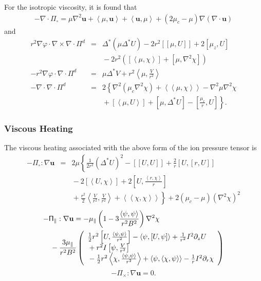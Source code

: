 \documentclass[letterpaper]{book}
\renewcommand{\vec}[1]{\ensuremath{\mathbf{#1}}}
\newcommand{\tensor}[1]{\mathsf{#1}}
\newcommand{\tor}{\varphi}              %
\renewcommand{\u}{\vec{u}}
\renewcommand{\P}{\tensor{\Pi}}
\newcommand{\grad}[1]{\nabla #1}
\renewcommand{\div}[1]{\nabla \cdot #1}
\newcommand{\curl}[1]{\nabla \times #1}
\newcommand{\dotdot}{:}
\newcommand{\gs}[1]{\Delta^* #1}
\newcommand{\lp}[1]{\nabla^2 #1}
\newcommand{\pb}[2]{\left[#1,#2\right]}
\newcommand{\ip}[2]{\left\langle  #1,#2\right\rangle}
\newcommand{\funcss}[2]{
  \left\langle\left\langle #1,#2 \right\rangle\right\rangle}
\newcommand{\funcsa}[2]{\left[\left\langle #1,#2 \right\rangle\right]}
\newcommand{\funcaa}[2]{\left[\left[ #1,#2 \right]\right]}
\begin{document}
For the isotropic viscosity, it is found that
\begin{eqnarray*}
  -\div{\P_\circ} = \mu \lp{\u} + \ip{\mu}{\u} + \ip{\u}{\mu}
  + (2 \mu_c - \mu) \grad{(\div{\u})}
\end{eqnarray*}
and
\begin{eqnarray}
   r^2 \grad{\tor} \cdot \curl{\div \P^d} & = & 
   \gs{(\mu \gs{U})} - 2 r^2 \funcaa{\mu}{U} + 2\pb{\mu_z}{U}
   \\ \nonumber && \mbox{} 
   - 2 r^2 \left( \funcsa{\mu}{\chi} + \pb{\mu}{\lp{\chi}} \right)
   \\
   -r^2 \grad \tor \cdot \div \P^d & = & \mu \gs{V} 
   + r^2 \ip{\mu}{\frac{V}{r^2}}
   \\
   -\div \div \P^d & = & 2 \left\{ \lp{(\mu_c \lp{\chi})} 
   + \funcss{\mu}{\chi} - \lp{\mu}\lp{\chi}
   \right. \\ && \left. \nonumber \mbox{}
   + \funcsa{\mu}{U} + \pb{\mu}{\gs{U}} - \pb{\frac{\mu_r}{r}}{U} 
   \right\}.
\end{eqnarray}

\subsubsection{Viscous Heating}

The viscous heating associated with the above form of the ion pressure
tensor is
\begin{eqnarray}
  - \P_\circ \dotdot \grad{\u} & = & 2 \mu \left\{
    \frac{1}{2 r^2} (\gs{U})^2 
    - \funcaa{U}{U} + \frac{2}{r} \pb{U}{\pb{r}{U}}
    \right. \\ \nonumber & & \left. \mbox{} 
    - 2 \funcsa{U}{\chi} + 2 \pb{U}{\frac{\ip{r}{\chi}}{r}}
    \right. \\ \nonumber & & \left. \mbox{}
    + \frac{r^2}{2} \ip{\frac{V}{r^2}}{\frac{V}{r^2}}
    + \funcss{\chi}{\chi} \right\}
  + 2 (\mu_c - \mu) (\lp{\chi})^2
\end{eqnarray}
\begin{eqnarray}
  \lefteqn{-\P_\parallel \dotdot \grad{\u} = - \mu_\parallel
    \left( 1-3 \frac{\ip{\psi}{\psi}}{r^2 B^2} \right) \lp{\chi}}
  \\ && \mbox{}
    - \frac{3 \mu_\parallel}{r^2 B^2} \left( \begin{array}{l}
      \frac{1}{2} r^2 \pb{U}{\frac{\ip{\psi}{\psi}}{r^2}}
      -\ip{\psi}{\pb{U}{\psi}} + \frac{1}{r^2} I^2 \partial_z U
       \\ \mbox{}
    + r^2 I \pb{\psi}{\frac{V}{r^2}}
       \\ \mbox{}
    - \frac{1}{2}r^2 \ip{\chi}{\frac{\ip{\psi}{\psi}}{r^2}}
    + \ip{\psi}{\ip{\chi}{\psi}} - \frac{1}{r}I^2 \partial_r \chi
    \end{array}    \right)\nonumber
\end{eqnarray}
\begin{equation}
  - \P_\times \dotdot \grad{\u} = 0.
\end{equation}
\end{document}
